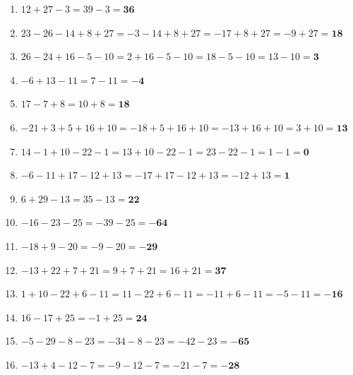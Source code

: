 \documentclass[a4paper,10pt]{article} %
\begin{document}
\begin{enumerate}
  \item \(12 + 27 - 3 =
    39 - 3 =
    \mathbf{36}\) %

  \item \(23 - 26 - 14 + 8 + 27 =
    -3 - 14 + 8 + 27 =
    -17 + 8 + 27 =
    -9 + 27 =
    \mathbf{18}\) %

  \item \(26 - 24 + 16 - 5 - 10 =
    2 + 16 - 5 - 10 =
    18 - 5 - 10 =
    13 - 10 =
    \mathbf{3}\) %

  \item \(-6 + 13 - 11 =
    7 - 11 =
    \mathbf{-4}\) %

  \item \(17 - 7 + 8 =
    10 + 8 =
    \mathbf{18}\) %

  \item \(-21 + 3 + 5 + 16 + 10 =
    -18 + 5 + 16 + 10 =
    -13 + 16 + 10 =
    3 + 10 =
    \mathbf{13}\) %

  \item \(14 - 1 + 10 - 22 - 1 =
    13 + 10 - 22 - 1 =
    23 - 22 - 1 =
    1 - 1 =
    \mathbf{0}\) %

  \item \(-6 - 11 + 17 - 12 + 13 =
    -17 + 17 - 12 + 13 =
    -12 + 13 =
    \mathbf{1}\) %

  \item \(6 + 29 - 13 =
    35 - 13 =
    \mathbf{22}\) %

  \item \(-16 - 23 - 25 =
    -39 - 25 =
    \mathbf{-64}\) %

  \item \(-18 + 9 - 20 =
    -9 - 20 =
    \mathbf{-29}\) %

  \item \(-13 + 22 + 7 + 21 =
    9 + 7 + 21 =
    16 + 21 =
    \mathbf{37}\) %

  \item \(1 + 10 - 22 + 6 - 11 =
    11 - 22 + 6 - 11 =
    -11 + 6 - 11 =
    -5 - 11 =
    \mathbf{-16}\) %

  \item \(16 - 17 + 25 =
    -1 + 25 =
    \mathbf{24}\) %

  \item \(-5 - 29 - 8 - 23 =
    -34 - 8 - 23 =
    -42 - 23 =
    \mathbf{-65}\) %

  \item \(-13 + 4 - 12 - 7 =
    -9 - 12 - 7 =
    -21 - 7 =
    \mathbf{-28}\) %

\end{enumerate}
\end{document}
